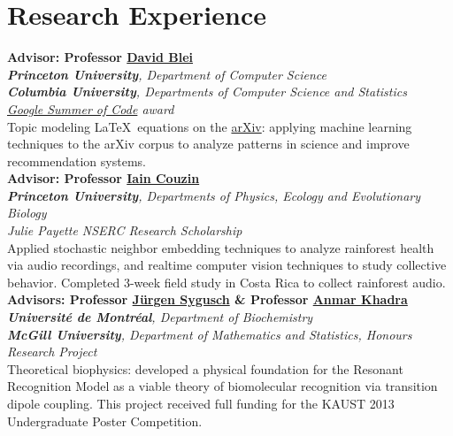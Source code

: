 \documentclass[12pt, letterpaper]{article}
\newcommand{\years}[1]{\marginnote{\normalsize #1}}
\begin{document}
\section*{Research Experience}
\noindent
\years{4/2014-\hspace*{35pt}}\textbf{Advisor: Professor \href{http://www.cs.princeton.edu/~blei/}{David Blei}}\\
\emph{\textbf{Princeton University}, Department of Computer Science}\\
\emph{\textbf{Columbia University}, Departments of Computer Science and Statistics}\\
\emph{\href{https://www.google-melange.com/gsoc/project/details/google/gsoc2014/jaanaltosaar/5741031244955648}{Google Summer of Code} award}\\
Topic modeling \LaTeX~equations on the \href{http://arxiv.org/}{arXiv}: applying machine learning techniques to the arXiv corpus to analyze patterns in science and improve recommendation systems.\\

\years{9/2013-4/2014}\textbf{Advisor: Professor \href{http://icouzin.princeton.edu/}{Iain Couzin}}\\
\emph{\textbf{Princeton University}, Departments of Physics, Ecology and Evolutionary Biology}\\
\emph{Julie Payette NSERC Research Scholarship}\\
Applied stochastic neighbor embedding techniques to analyze rainforest health via audio recordings, and realtime computer vision techniques to study collective behavior. Completed 3-week field study in Costa Rica to collect rainforest audio.\\

\years{9/2012-7/2013}\textbf{Advisors: Professor \href{http://esilrch1.esi.umontreal.ca/~syguschj/home.html}{Jürgen Sygusch} \& Professor \href{http://www.medicine.mcgill.ca/physio/khadralab/}{Anmar Khadra}}\\
\emph{\textbf{Université de Montréal}, Department of Biochemistry}\\
\emph{\textbf{McGill University}, Department of Mathematics and Statistics, Honours Research Project}\\
Theoretical biophysics: developed a physical foundation for the Resonant Recognition Model as a viable theory of biomolecular recognition via transition dipole coupling. This project received full funding for the KAUST 2013 Undergraduate Poster Competition.\\  
\end{document}
